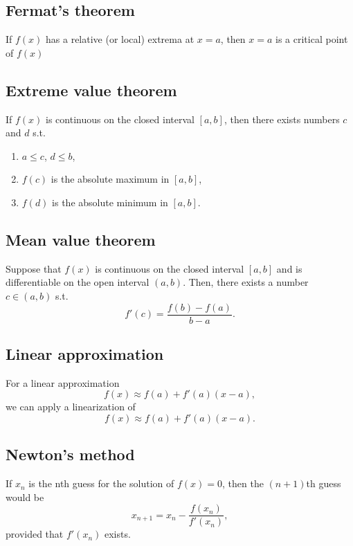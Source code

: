 \documentclass[main.tex]{subfiles}
\begin{document}
\begin{multicols}{2}
	\subsection*{Fermat's theorem}
	\begin{theorem}
	If \(f(x)\) has a relative (or local) extrema at \(x = a\), then \(x = a\) is a critical point of \(f(x)\)
	\end{theorem}

	\subsection*{Extreme value theorem}
	\begin{theorem}
	If \(f(x)\) is continuous on the closed interval \([a, b]\), then there exists numbers \(c\) and \(d\) s.t.
	\begin{enumerate}
		\item \(a \leq c\), \(d \leq b\),
		\item \(f(c)\) is the absolute maximum in \([a, b]\),
		\item \(f(d)\) is the absolute minimum in \([a, b]\).
	\end{enumerate}
	\end{theorem}

	\subsection*{Mean value theorem}
	\begin{theorem}
	Suppose that \(f(x)\) is continuous on the closed interval \([a, b]\) and is differentiable on the open interval \((a, b)\).
	Then, there exists a number \(c \in (a, b)\) s.t. \[f'(c) = \frac{f(b) - f(a)}{b - a}.\]
	\end{theorem}

	\subsection*{Linear approximation}
	For a linear approximation \[f(x) \approx f(a) + f'(a)(x - a),\] we can apply a linearization of \[f(x) \approx f(a) + f'(a)(x - a).\]

	\subsection*{Newton's method}
	\begin{definition}
	If \(x_n\) is the nth guess for the solution of \(f(x) = 0\), then the \((n + 1)\)th guess would be \[x_{n+1} = x_n - \frac{f(x_n)}{f'(x_n)},\] provided that \(f'(x_n)\) exists.
	\end{definition}


\end{multicols}
\end{document}
